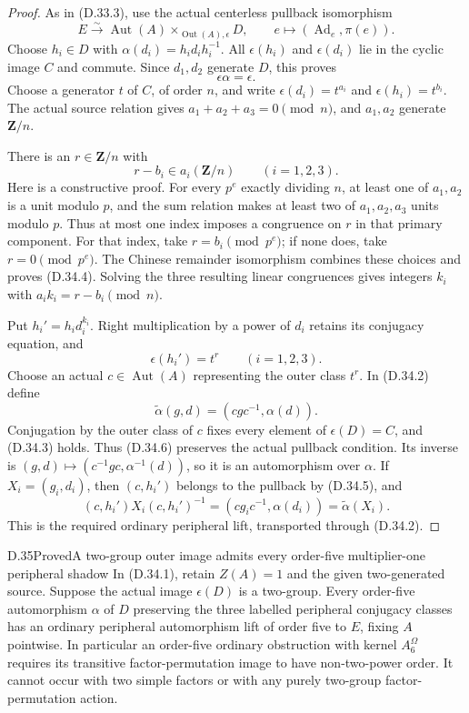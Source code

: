 \begin{proof}
As in \textup{(D.33.3)}, use the actual
centerless pullback isomorphism
\[
 E\xrightarrow{\sim}
       \operatorname{Aut}(A)\times_{\operatorname{Out}(A),\epsilon}D,
 \qquad e\longmapsto(\operatorname{Ad}_e,\pi(e)).
 \tag{D.34.2}
\]
Choose $h_i\in D$ with
$\alpha(d_i)=h_i d_i h_i^{-1}$.
All $\epsilon(h_i)$ and
$\epsilon(d_i)$ lie in the cyclic
image $C$ and commute.
Since $d_1,d_2$ generate $D$,
this proves
\[
                         \epsilon\alpha=\epsilon.
 \tag{D.34.3}
\]
Choose a generator $t$ of $C$,
of order $n$, and write
$\epsilon(d_i)=t^{a_i}$ and
$\epsilon(h_i)=t^{b_i}$.
The actual source relation gives
$a_1+a_2+a_3=0\pmod n$, and
$a_1,a_2$ generate $\mathbf Z/n$.

There is an $r\in\mathbf Z/n$ with
\[
                 r-b_i\in a_i(\mathbf Z/n)
                         \qquad(i=1,2,3).
 \tag{D.34.4}
\]
Here is a constructive proof.
For every $p^e$ exactly dividing
$n$, at least one of $a_1,a_2$
is a unit modulo $p$, and the
sum relation makes at least two
of $a_1,a_2,a_3$ units modulo $p$.
Thus at most one index imposes
a congruence on $r$ in that
primary component.
For that index, take
$r=b_i\pmod {p^e}$; if none
does, take $r=0\pmod {p^e}$.
The Chinese remainder isomorphism
combines these choices and proves
\textup{(D.34.4)}.
Solving the three resulting
linear congruences gives integers
$k_i$ with
$a_i k_i=r-b_i\pmod n$.

Put $h_i'=h_i d_i^{k_i}$.
Right multiplication by a power
of $d_i$ retains its conjugacy
equation, and
\[
                  \epsilon(h_i')=t^r
                           \qquad(i=1,2,3).
 \tag{D.34.5}
\]
Choose an actual
$c\in\operatorname{Aut}(A)$
representing the outer class
$t^r$.  In \textup{(D.34.2)}
define
\[
       \widetilde\alpha(g,d)
                    =(cgc^{-1},\alpha(d)).
 \tag{D.34.6}
\]
Conjugation by the outer class
of $c$ fixes every element of
$\epsilon(D)=C$, and
\textup{(D.34.3)} holds.
Thus \textup{(D.34.6)} preserves
the actual pullback condition.
Its inverse is
$(g,d)\mapsto(c^{-1}gc,\alpha^{-1}(d))$,
so it is an automorphism over
$\alpha$.
If $X_i=(g_i,d_i)$, then
$(c,h_i')$ belongs to the
pullback by
\textup{(D.34.5)}, and
\[
       (c,h_i')X_i(c,h_i')^{-1}
           =(cg_ic^{-1},\alpha(d_i))
           =\widetilde\alpha(X_i).
 \tag{D.34.7}
\]
This is the required ordinary
peripheral lift, transported
through \textup{(D.34.2)}.
\end{proof}

\begin{statement}{D.35}{Proved}{A two-group outer image admits every order-five multiplier-one peripheral shadow}
In \textup{(D.34.1)}, retain
$Z(A)=1$ and the given
two-generated source.
Suppose the actual image
$\epsilon(D)$ is a two-group.
Every order-five automorphism
$\alpha$ of $D$ preserving
the three labelled peripheral
conjugacy classes has an
ordinary peripheral automorphism
lift of order five to $E$,
fixing $A$ pointwise.
In particular an order-five
ordinary obstruction with
kernel $A_6^\Omega$ requires
its transitive factor-permutation
image to have non-two-power
order.  It cannot occur with
two simple factors or with
any purely two-group
factor-permutation action.
\end{statement}

